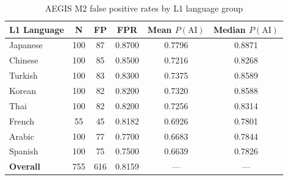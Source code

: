 \begin{table}[ht]
\centering
\caption{AEGIS M2 false positive rates by L1 language group}
\label{tab:fairness}
\begin{tabular}{lccccc}
\hline
\textbf{L1 Language} & \textbf{N} & \textbf{FP} & \textbf{FPR} & \textbf{Mean $P(\text{AI})$} & \textbf{Median $P(\text{AI})$} \\
\hline
Japanese & 100 & 87 & 0.8700 & 0.7796 & 0.8871 \\
Chinese & 100 & 85 & 0.8500 & 0.7216 & 0.8268 \\
Turkish & 100 & 83 & 0.8300 & 0.7375 & 0.8589 \\
Korean & 100 & 82 & 0.8200 & 0.7320 & 0.8588 \\
Thai & 100 & 82 & 0.8200 & 0.7256 & 0.8314 \\
French & 55 & 45 & 0.8182 & 0.6926 & 0.7801 \\
Arabic & 100 & 77 & 0.7700 & 0.6683 & 0.7844 \\
Spanish & 100 & 75 & 0.7500 & 0.6639 & 0.7826 \\
\hline
\textbf{Overall} & 755 & 616 & 0.8159 & — & — \\
\hline
\end{tabular}
\end{table}